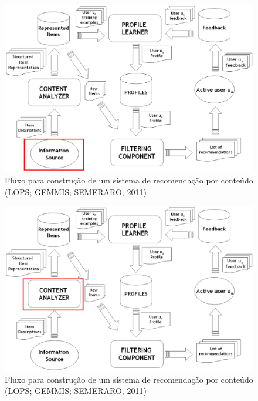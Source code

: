 \begin{frame}

\begin{figure}[h!]
  \centering
    \includegraphics[width=1\textwidth]{figura/recomendacao_conteudo_1.eps}
  \caption{Fluxo para construção de um sistema de recomendação por conteúdo (LOPS; GEMMIS; SEMERARO, 2011)}
\end{figure}

\end{frame}

\begin{frame}

\begin{figure}[h!]
  \centering
    \includegraphics[width=1\textwidth]{figura/recomendacao_conteudo_2.eps}
  \caption{Fluxo para construção de um sistema de recomendação por conteúdo (LOPS; GEMMIS; SEMERARO, 2011)}
\end{figure}

\end{frame}

